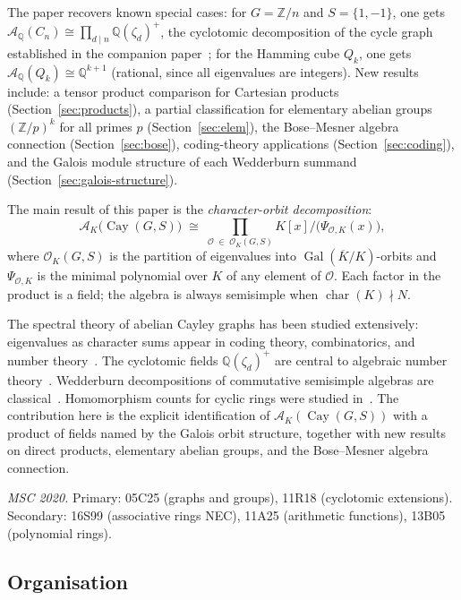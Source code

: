 \documentclass[12pt]{amsart}
\numberwithin{equation}{section}
\theoremstyle{plain}
\theoremstyle{definition}
\DeclareMathOperator{\Gal}{Gal}
\DeclareMathOperator{\ch}{char}
\DeclareMathOperator{\Cay}{Cay}
\newcommand{\Z}{\mathbb{Z}}
\newcommand{\Q}{\mathbb{Q}}
\newcommand{\calA}{\mathcal{A}}
\newcommand{\calO}{\mathcal{O}}
\begin{document}
The paper recovers known special cases: for $G = \Z/n$ and $S = \{1,-1\}$,
one gets $\calA_\Q(C_n) \cong \prod_{d \mid n} \Q(\zeta_d)^+$, the
cyclotomic decomposition of the cycle graph established in the companion
paper~\cite{MKB26}; for the Hamming cube $Q_k$, one gets
$\calA_\Q(Q_k) \cong \Q^{k+1}$ (rational, since all eigenvalues are
integers).  New results include: a tensor product comparison for Cartesian
products (Section~\ref{sec:products}), a partial classification for
elementary abelian groups $(\Z/p)^k$ for all primes $p$
(Section~\ref{sec:elem}), the Bose--Mesner algebra connection
(Section~\ref{sec:bose}), coding-theory applications
(Section~\ref{sec:coding}), and the Galois module structure of each
Wedderburn summand (Section~\ref{sec:galois-structure}).

The main result of this paper is the \emph{character-orbit decomposition}:
\begin{equation}
\label{eq:main-intro}
  \calA_K\!\bigl(\Cay(G,S)\bigr)
  \;\cong\;
  \prod_{\calO\;\in\;\calO_K(G,S)}
  K[x]\bigl/\bigl(\Psi_{\calO,K}(x)\bigr),
\end{equation}
where $\calO_K(G,S)$ is the partition of eigenvalues into
$\Gal(\overline{K}/K)$-orbits and $\Psi_{\calO,K}$ is the minimal
polynomial over $K$ of any element of $\calO$.  Each factor in the product
is a field; the algebra is always semisimple when $\ch(K) \nmid N$.

The spectral theory of abelian Cayley graphs has been studied extensively:
eigenvalues as character sums appear in coding theory, combinatorics, and
number theory~\cite{BH12,CDS79}.  The cyclotomic fields $\Q(\zeta_d)^+$
are central to algebraic number theory~\cite{IR90,Neu99,Was97}.  Wedderburn
decompositions of commutative semisimple algebras are classical~\cite{DF04,
Jac80,Lang02}.  Homomorphism counts for cyclic rings were studied in~\cite{GVB84}.
The contribution here is the explicit identification of
$\calA_K(\Cay(G,S))$ with a product of fields named by the Galois orbit
structure, together with new results on direct products, elementary abelian
groups, and the Bose--Mesner algebra connection.

\textit{MSC 2020.}  Primary: 05C25 (graphs and groups), 11R18 (cyclotomic
extensions).  Secondary: 16S99 (associative rings NEC), 11A25 (arithmetic
functions), 13B05 (polynomial rings).

\subsection{Organisation}
\end{document}
